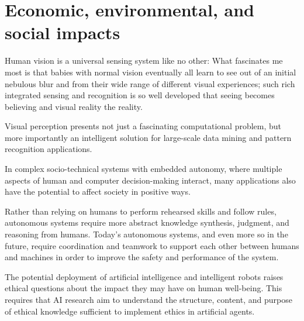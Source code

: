 \documentclass[12pt, a4paper]{article}
\begin{document}



\section{Economic, environmental, and social impacts}
Human vision is a universal sensing system like no other: What fascinates me most is that babies with normal vision eventually all learn to see out of an initial nebulous blur and from their wide range of different visual experiences; such rich integrated sensing and recognition is so well developed that seeing becomes believing and visual reality the reality.

Visual perception presents not just a fascinating computational problem, but more importantly an intelligent solution for large-scale data mining and pattern recognition applications.

In complex socio-technical systems with embedded autonomy, where multiple aspects of human and computer decision-making interact, many applications also have the potential to affect society in positive ways.

Rather than relying on humans to perform rehearsed skills and follow rules, autonomous systems require more abstract knowledge synthesis, judgment, and reasoning from humans. Today's autonomous systems, and even more so in the future, require coordination and teamwork to support each other between humans and machines in order to improve the safety and performance of the system.

The potential deployment of artificial intelligence and intelligent robots raises ethical questions about the impact they may have on human well-being. This requires that AI research aim to understand the structure, content, and purpose of ethical knowledge sufficient to implement ethics in artificial agents.


\end{document}
